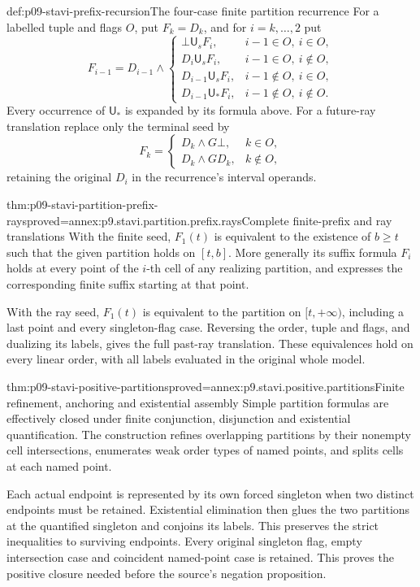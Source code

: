 \begin{hbdefinition}{def:p09-stavi-prefix-recursion}{The four-case finite partition recurrence}
For a labelled tuple and flags \(O\), put
\(F_k=D_k\), and for \(i=k,\ldots,2\) put
\[
 F_{i-1}=D_{i-1}\land
 \begin{cases}
    \bot\mathbin{\mathsf U_s}F_i,&i-1\in O,\ i\in O,\\
    D_i\mathbin{\mathsf U_s}F_i,&i-1\in O,\ i\notin O,\\
    D_{i-1}\mathbin{\mathsf U_s}F_i,&i-1\notin O,\ i\in O,\\
    D_{i-1}\mathbin{\mathsf U_*}F_i,&i-1\notin O,\ i\notin O.
 \end{cases}
\]
Every occurrence of \(\mathsf U_*\) is
expanded by its formula above.
For a future-ray translation replace
only the terminal seed by
\[
 F_k=
 \begin{cases}
   D_k\land G\bot,&k\in O,\\
   D_k\land GD_k,&k\notin O,
 \end{cases}
\]
retaining the original \(D_i\) in the
recurrence's interval operands.
\end{hbdefinition}

\begin{hbtheorem}{thm:p09-stavi-partition-prefix-rays}{proved=annex:p9.stavi.partition.prefix.rays}{Complete finite-prefix and ray translations}
With the finite seed, \(F_1(t)\) is
equivalent to the existence of \(b\geq t\)
such that the given partition holds
on \([t,b]\). More generally its suffix
formula \(F_i\) holds at every point
of the \(i\)-th cell of any realizing
partition, and expresses the corresponding
finite suffix starting at that point.

With the ray seed, \(F_1(t)\) is
equivalent to the partition on
\([t,+\infty)\), including a last
point and every singleton-flag case.
Reversing the order, tuple and flags,
and dualizing its labels,
gives the full past-ray translation.
These equivalences hold on every
linear order, with all labels evaluated
in the original whole model.
\end{hbtheorem}

\begin{hbtheorem}{thm:p09-stavi-positive-partitions}{proved=annex:p9.stavi.positive.partitions}{Finite refinement, anchoring and existential assembly}
Simple partition formulas are effectively
closed under finite conjunction,
disjunction and existential quantification.
The construction refines overlapping
partitions by their nonempty cell
intersections, enumerates weak order
types of named points, and splits
cells at each named point.

Each actual endpoint is represented
by its own forced singleton when
two distinct endpoints must be
retained. Existential elimination
then glues the two partitions at
the quantified singleton and
conjoins its labels. This preserves
the strict inequalities to surviving
endpoints. Every original singleton
flag, empty intersection case and
coincident named-point case is retained.
This proves the positive closure
needed before the source's negation
proposition.
\end{hbtheorem}

